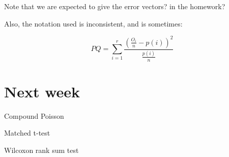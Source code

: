 \documentclass[a4paper]{article}
\newenvironment{enumerate*}%
  {\begin{enumerate}%
    \setlength{\itemsep}{0.5pt}%
    \setlength{\parsep}{0pt}%
    \setlength{\parskip}{0pt}}%
  {\end{enumerate}}
\begin{document}
Note that we are expected to give the error vectors? in the homework?

Also, the notation used is inconsistent, and is sometimes:

\[PQ=\sum_{i=1}^r \frac{(\frac{O_i}{n} - p(i))^2}{\frac{p(i)}{n}}\]

\section{Next week}

\begin{enumerate*}
  \item Compound Poisson
  \item Matched t-test
  \item Wilcoxon rank sum test
\end{enumerate*}
\end{document}
